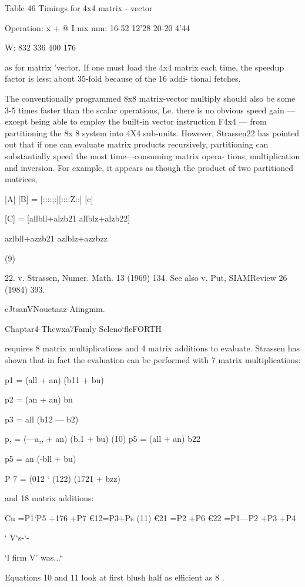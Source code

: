 {{{{{\begin{itemize}
{{{{{{{{{{{{{{{Table 46 Timings for 4x4 matrix - vector

Operation: x + @ I
mx mm: 16-52 12'28 20-20 4'44

W: 832 336 400 176

as for matrix 'vector. If one must load the 4x4 matrix each time,
the speedup factor is less: about 35-fold because of the 16 addi-
tional fetches.

The conventionally programmed 8x8 matrix-vector multiply
should also be some 3-5 times faster than the scalar operations,
Le. there is no obvious speed gain — except being able to employ
the built-in vector instruction F4x4 — from partitioning the 8x 8
system into 4X4 sub-units. However, Strassen22 has pointed out
that if one can evaluate matrix products recursively, partitioning
can substantially speed the most time—consuming matrix opera-
tions, multiplication and inversion. For example, it appears as
though the product of two partitioned matrices,

[A] [B] = [::::;:][::::Z::] [c]

[C] = [allbll+alzb21 allblz+alzb22]

azlbll+azzb21 azlblz+azzbzz

(9)

 

22. v. Strassen, Numer. Math. 13 (1969) 134. See also v. Put, SIAMReview 26 (1984) 393.

cJtsanVNouetaaz-Aiingmm.

Chaptar4-Thewxa7Famly Scleno‘flcFORTH

requires 8 matrix multiplications and 4 matrix additions to
evaluate. Strassen has shown that in fact the evaluation can be
performed with 7 matrix multiplications:

p1 = (all + an) (b11 + bu)

p2 = (an + an) bn

p3 = all (b12 — b2)

p, = (—a,, + an) (b,1 + bu) (10)
p5 = (all + an) b22

p5 = an (-bll + bu)

P 7 = (012 ‘ (122) (1721 + bzz)

and 18 matrix additions:

Cu =P1‘P5 +176 +P7
€12=P3+Ps
(11)
€21 =P2 +P6
€22 =P1—P2 +P3 +P4

‘ V‘s-‘-

‘l firm V' was...“

Equations 10 and 11 look at first blush half as efficient as 8 .

}}}}}}}}}}}}}}}
\end{itemize}}}}}}
